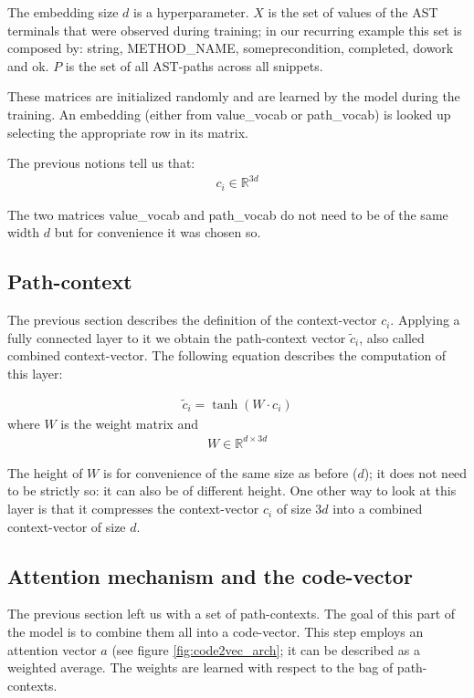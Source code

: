 The embedding size $d$ is a hyperparameter. $X$ is the set of values of the AST terminals that were observed during training; in our recurring example this set is composed by: string, METHOD\_NAME, someprecondition, completed, dowork and ok. 
$P$ is the set of all AST-paths across all snippets.

These matrices are initialized randomly and are learned by the model during the training.
An embedding (either from value\_vocab or path\_vocab) is looked up selecting the appropriate row in its matrix.

The previous notions tell us that:
\begin{align*} 
c_i \in  \mathbb{R}^{3 d}
\end{align*}

The two matrices value\_vocab and path\_vocab do not need to be of the same width $d$ but for convenience it was chosen so.

\subsection{Path-context}
The previous section describes the definition of the context-vector $c_i$. Applying a fully connected layer to it we obtain the path-context vector $\widetilde{c}_i$, also called combined context-vector. The following equation describes the computation of this layer:

\begin{align*} 
\widetilde{c}_i = \tanh( W \cdot c_i )
\end{align*}
where $W$ is the weight matrix and
\begin{align*} 
W \in  \mathbb{R}^{d \times 3 d}
\end{align*}

The height of $W$ is for convenience of the same size as before ($d$); it does not need to be strictly so: it can also be of different height.
One other way to look at this layer is that it compresses the context-vector $c_i$ of size $3d$ into a combined context-vector of size $d$.

\subsection{Attention mechanism and the code-vector} \label{sec:attention_code_vector}
The previous section left us with a set of path-contexts. The goal of this part of the model is to combine them all into a code-vector.
This step employs an attention vector $a$ (see figure \ref{fig:code2vec_arch}; it can be described as a weighted average. The weights are learned with respect to the bag of path-contexts. 


